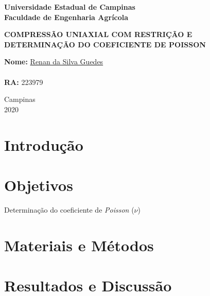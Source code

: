 \documentclass[a4paper, 12pt]{article}
\begin{document}
	\begin{titlepage}
		\begin{center}
			\begin{large}
				\textbf{Universidade Estadual de Campinas}\\\vspace{.5cm}
				\textbf{Faculdade de Engenharia Agrícola}\\\vspace{10.5cm}
			\end{large}
			\begin{large}
				\uppercase{\textbf{Compressão Uniaxial com Restrição e determinação do coeficiente de Poisson}}\\\vspace{4cm}
			\end{large}
		\end{center}
		\begin{large}
			\noindent\textbf{Nome:} \href{https://github.com/RenanSGuedes/576}{Renan da Silva Guedes}\\\\
			\noindent\textbf{RA:} 223979\\\vspace{4cm}
		\end{large}
		\begin{center}
			\begin{large}
				Campinas\\\vspace{.3cm}
				2020
			\end{large}
		\end{center}
	\end{titlepage}
	
	\newpage
	
	\section{Introdução}
	\section{Objetivos}
	
	Determinação do coeficiente de \textit{Poisson} ($\nu$)
	
	\section{Materiais e Métodos}
	\section{Resultados e Discussão}
\end{document}
